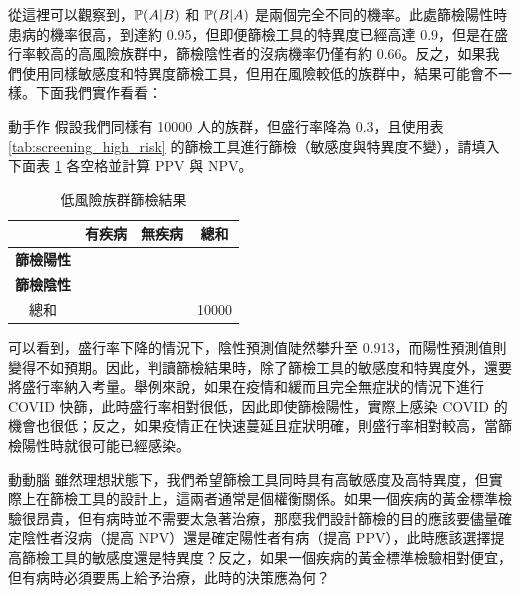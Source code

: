     從這裡可以觀察到，$\mathbb{P}(A|B)$ 和 $\mathbb{P}(B|A)$ 是兩個完全不同的機率。此處篩檢陽性時患病的機率很高，到達約 0.95，但即便篩檢工具的特異度已經高達 0.9，但是在盛行率較高的高風險族群中，篩檢陰性者的沒病機率仍僅有約 0.66。反之，如果我們使用同樣敏感度和特異度篩檢工具，但用在風險較低的族群中，結果可能會不一樣。下面我們實作看看：

    \bigskip
    
    \begin{custom}{動手作}
        假設我們同樣有 10000 人的族群，但盛行率降為 0.3，且使用表 \ref{tab:screening_high_risk} 的篩檢工具進行篩檢（敏感度與特異度不變），請填入下面表 \ref{tab:screening_low_risk} 各空格並計算 PPV 與 NPV。
    \end{custom}

    \begin{table}[htbp]
        \begin{center}
            \begin{tabular}{c|cc|c}
                \toprule
                 & \textbf{有疾病} & \textbf{無疾病} & 總和\\
                \hline
                \textbf{篩檢陽性} & \phantom{2400} & \phantom{700} & \phantom{3100}\\
                \textbf{篩檢陰性} & \phantom{600} & \phantom{6300} & \phantom{6900}\\
                \hline
                總和 & \phantom{3000} & \phantom{7000} & 10000\\
                \bottomrule
            \end{tabular}
            \caption{低風險族群篩檢結果\label{tab:screening_low_risk}}
        \end{center}
    \end{table}

    可以看到，盛行率下降的情況下，陰性預測值陡然攀升至 0.913，而陽性預測值則變得不如預期。因此，判讀篩檢結果時，除了篩檢工具的敏感度和特異度外，還要將盛行率納入考量。舉例來說，如果在疫情和緩而且完全無症狀的情況下進行 COVID 快篩，此時盛行率相對很低，因此即使篩檢陽性，實際上感染 COVID 的機會也很低；反之，如果疫情正在快速蔓延且症狀明確，則盛行率相對較高，當篩檢陽性時就很可能已經感染。

    \bigskip

    \begin{custom}{動動腦}
        雖然理想狀態下，我們希望篩檢工具同時具有高敏感度及高特異度，但實際上在篩檢工具的設計上，這兩者通常是個權衡關係。如果一個疾病的黃金標準檢驗很昂貴，但有病時並不需要太急著治療，那麼我們設計篩檢的目的應該要儘量確定陰性者沒病（提高 NPV）還是確定陽性者有病（提高 PPV），此時應該選擇提高篩檢工具的敏感度還是特異度？反之，如果一個疾病的黃金標準檢驗相對便宜，但有病時必須要馬上給予治療，此時的決策應為何？
    \end{custom}

